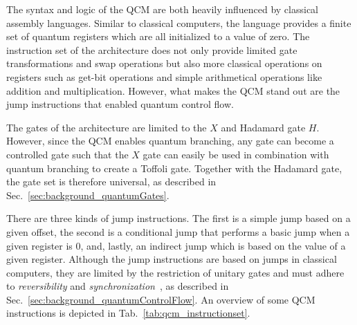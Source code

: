 The syntax and logic of the QCM are both heavily influenced by classical assembly languages. Similar to classical computers,
the language provides a finite set of quantum registers which are all initialized to a value of zero. The instruction set of the architecture does not only provide limited gate transformations and swap operations but also more classical operations on registers such as get-bit operations and simple arithmetical operations like addition and multiplication. However, what makes the QCM stand out are the jump instructions that enabled quantum control flow.

The gates of the architecture are limited to the $X$ and Hadamard gate $H$. However, since the QCM enables quantum branching, any gate can become a controlled gate such that the $X$ gate can easily be used in combination with quantum branching to create a Toffoli gate. Together with the Hadamard gate, the gate set is therefore universal, as described in Sec.~\ref{sec:background_quantumGates}.

There are three kinds of jump instructions. The first is a simple jump based on a given offset, the second is a conditional jump that performs a basic jump when a given register is $0$, and, lastly, an indirect jump which is based on the value of a given register. Although the jump instructions are based on jumps in classical computers, they are limited by the restriction of unitary gates and must adhere to \emph{reversibility} and \emph{synchronization}~\cite{YVC24}, as described in Sec.~\ref{sec:background_quantumControlFlow}. An overview of some QCM instructions is depicted in Tab.~\ref{tab:qcm_instructionset}.

